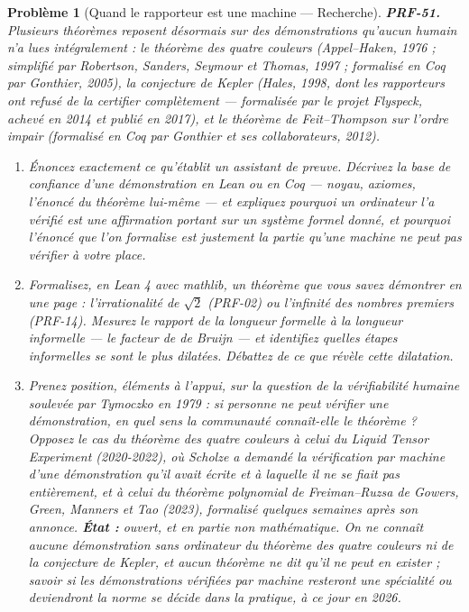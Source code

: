 \documentclass[11pt]{article}
\newtheorem{problem}{Problème}
\begin{document}
\begin{problem}[{Quand le rapporteur est une machine --- Recherche}]
\textbf{PRF-51.} Plusieurs théorèmes reposent désormais sur des démonstrations
qu'aucun humain n'a lues intégralement : le théorème des quatre couleurs (Appel--Haken,
1976 ; simplifié par Robertson, Sanders, Seymour et Thomas, 1997 ; formalisé en Coq par
Gonthier, 2005), la conjecture de Kepler (Hales, 1998, dont les rapporteurs ont refusé de la
certifier complètement --- formalisée par le projet Flyspeck, achevé en 2014 et publié en
2017), et le théorème de Feit--Thompson sur l'ordre impair (formalisé en Coq par Gonthier et
ses collaborateurs, 2012).
\begin{enumerate}
\item[(a)] Énoncez exactement ce qu'établit un assistant de preuve. Décrivez la base de confiance
d'une démonstration en Lean ou en Coq --- noyau, axiomes, l'énoncé du théorème lui-même --- et
expliquez pourquoi \og{} un ordinateur l'a vérifié \fg{} est une affirmation portant sur un système
formel donné, et pourquoi l'énoncé que l'on formalise est justement la partie qu'une machine
ne peut pas vérifier à votre place.
\item[(b)] Formalisez, en Lean 4 avec mathlib, un théorème que vous savez démontrer en une page :
l'irrationalité de $ \sqrt{2} $ (PRF-02) ou l'infinité des nombres premiers (PRF-14).
Mesurez le rapport de la longueur formelle à la longueur informelle --- le \og{} facteur de de
Bruijn \fg{} --- et identifiez quelles étapes informelles se sont le plus dilatées. Débattez de ce
que révèle cette dilatation.
\item[(c)] Prenez position, éléments à l'appui, sur la question de la vérifiabilité humaine
soulevée par Tymoczko en 1979 : si personne ne peut vérifier une démonstration, en quel sens
la communauté connaît-elle le théorème ? Opposez le cas du théorème des quatre couleurs à
celui du Liquid Tensor Experiment (2020-2022), où Scholze a demandé la vérification par
machine d'une démonstration qu'il avait écrite et à laquelle il ne se fiait pas
entièrement, et à celui du théorème polynomial de Freiman--Ruzsa de Gowers, Green, Manners et
Tao (2023), formalisé quelques semaines après son annonce.
\textbf{État :} ouvert, et en partie non mathématique. On ne connaît aucune démonstration sans
ordinateur du théorème des quatre couleurs ni de la conjecture de Kepler, et aucun théorème
ne dit qu'il ne peut en exister ; savoir si les démonstrations vérifiées par machine
resteront une spécialité ou deviendront la norme se décide dans la pratique, à ce jour en
2026.
\end{enumerate}

\end{problem}
\end{document}
